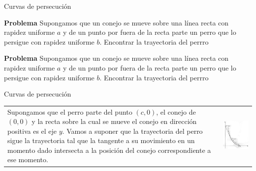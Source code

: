 \documentclass[handout,hyperref={colorlinks=true}]{beamer}
\begin{document}
\begin{frame}{Curvas de persecución}
 
\textbf{Problema} Supongamos que un conejo se mueve sobre una 
línea recta con rapidez uniforme $a$ y de un punto por fuera de la recta parte un perro que lo 
persigue con rapidez uniforme $b$. Encontrar la trayectoria del perrro
 
\begin{center}
\end{center}

 
 

 
\textbf{Problema} Supongamos que un conejo se mueve sobre una 
línea recta con rapidez uniforme $a$ y de un punto por fuera de la recta parte un perro que lo persigue con rapidez uniforme $b$. Encontrar la trayectoria del perrro
\begin{center}
\end{center}
 
 
\end{frame}

\begin{frame}{Curvas de persecución}
 \begin{tabular}{m{4.5cm} m{5cm}}
Supongamos que el perro parte del punto $(c,0)$, el conejo de $(0,0 )$ y la recta sobre la cual se mueve el conejo en dirección positiva  es el eje $y$. 
Vamos a suponer que la trayectoria del perro sigue la trayectoria tal que 
la tangente a su movimiento en un momento dado intersecta a la posición del conejo correspondiente a ese momento.
& \includegraphics[scale=.4]{imagenes/persecucion.jpg}
\end{tabular}
\end{frame}
\end{document}
